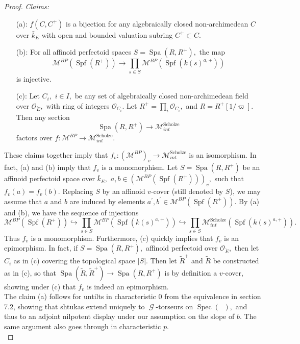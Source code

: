 \documentclass[a4paper,10,5 pt]{amsart}
\theoremstyle{definition}
\DeclareMathOperator{\Spec}{Spec}
\DeclareMathOperator{\Spa}{Spa}
\DeclareMathOperator{\Spf}{Spf}
\DeclareMathOperator{\Ainf}{\mathbb{A}_{inf}}
\DeclareMathOperator{\G}{\mathcal{G}}
\begin{document}
\begin{proof}
\textit{Claims:}
\begin{enumerate}
\item[(a):] $f(C,C^{+})$ is a bijection for any algebraically closed non-archimedean $C$ over $\bar{k}_{E}$ with open and bounded valuation subring $C^{+}\subset C.$
\item[(b):] For all affinoid perfectoid spaces $S=\Spa(R,R^{+}),$ the map
$$
\mathcal{M}^{BP}(\Spf(R^{+}))\rightarrow \prod_{s\in S} \mathcal{M}^{BP}(\Spf(k(s)^{a,+}))
$$
is injective.
\item[(c):] Let $C_{i},$ $i\in I,$ be any set of algebraically closed non-archimedean field over $\mathcal{O}_{\breve{E}},$ with ring of integers $\mathcal{O}_{C_{i}}.$ Let $R^{+}=\prod_{i} \mathcal{O}_{C_{i}},$ and $R=R^{+}[1/\varpi].$ Then any section
$$
\Spa(R,R^{+})\rightarrow \mathcal{M}^{\text{Scholze}}_{int}
$$
factors over $f\colon \mathcal{M}^{BP}\rightarrow \mathcal{M}^{\text{Scholze}}_{int}.$
\end{enumerate}
These claims together imply that $f_{v}\colon (\mathcal{M}^{BP})_{v}\rightarrow \mathcal{M}^{\text{Scholze}}_{int}$ is an isomorphism. In fact, (a) and (b) imply that $f_{v}$ is a monomorphism. Let $S=\Spa(R,R^{+})$ be an affinoid perfectoid space over $\bar{k}_{E},$ $a,b\in (\mathcal{M}^{BP}(\Spf(R^{+})))_{v},$ such that $f_{v}(a)=f_{v}(b).$ Replacing $S$ by an affinoid $v$-cover (still denoted by $S$), we may assume that $a$ and $b$ are induced by elements $a^{\prime},b^{\prime}\in \mathcal{M}^{BP}(\Spf(R^{+})).$ By (a) and (b), we have the sequence of injections
$$
\mathcal{M}^{BP}(\Spf(R^{+}))\hookrightarrow \prod_{s\in S} \mathcal{M}^{BP}(\Spf(k(s)^{a,+}))\hookrightarrow \prod_{s\in S} \mathcal{M}^{\text{Scholze}}_{int}(\Spf(k(s)^{a,+})).
$$
Thus $f_{v}$ is a monomorphism. Furthermore, (c) quickly implies that $f_{v}$ is an epimorphism. In fact, if $S=\Spa(R,R^{+}),$ affinoid perfectoid over $\mathcal{O}_{\breve{E}},$ then let $C_{i}$ as in (c) covering the topological space $|S|.$ Then let $\tilde{R}^{+}$ and $\tilde{R}$ be constructed as in (c), so that
$\Spa(\tilde{R},\tilde{R}^{+}) \rightarrow \Spa(R,R^{+})$ is by definition a $v$-cover, showing under (c) that $f_{v}$ is indeed an epimorphism.
\\
The claim (a) follows for untilts in characteristic $0$ from the equivalence in section 7.2, showing that shtukas extend uniquely to $\G$-torseurs on $\Spec(\Ainf),$ and thus to an adjoint nilpotent display under our assumption on the slope of $b.$ The same argument also goes through in characteristic $p.$
\\

\end{proof}
\end{document}
